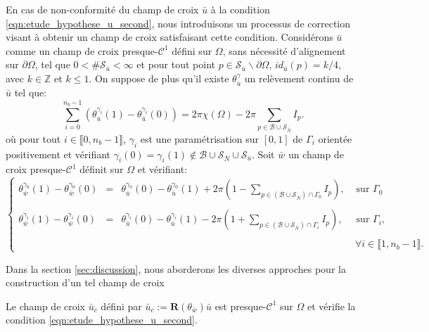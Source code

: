 En cas de non-conformité du champ de croix $\bar{u}$ à la condition \eqref{eqn:etude_hypothese_u_second}, nous introduisons un processus de correction visant à obtenir un champ de croix satisfaisant cette condition. Considérons $\bar{u}$ comme un champ de croix presque-$\mathcal{C}^1$ défini sur $\Omega$, sans nécessité d'alignement sur $\partial\Omega$, tel que $0<\#\mathcal{S}_{\bar{u}}<\infty$ et pour tout point $p\in\mathcal{S}_{\bar{u}}\backslash\partial\Omega$, $id_{\bar{u}}(p)=k/4$, avec $k\in\mathbb{Z}$ et $k\leq 1$. On suppose de plus qu'il existe $\theta_{\bar{u}}^\gamma$ un relèvement continu de $\bar{u}$ tel que:
\begin{equation}
    \displaystyle\sum_{i=0}^{n_b-1}\left(\theta_{\bar{u}}^{\gamma_i}(1)-\theta_{\bar{u}}^{\gamma_i}(0)\right)=2\pi\chi(\Omega)-2\pi\sum_{p\in\mathcal{B}\cup\mathcal{S}_{\bar{N}}}I_p.
\end{equation}
où pour tout $i\in\llbracket0, n_b-1\rrbracket$, $\gamma_i$ est une paramétrisation sur $[0, 1]$ de $\Gamma_i$ orientée positivement et vérifiant $\gamma_i(0)=\gamma_i(1)\notin\mathcal{B}\cup\mathcal{S}_{\bar{N}}\cup\mathcal{S}_{\bar{u}}$.
Soit $\bar{w}$ un champ de croix presque-$\mathcal{C}^1$ définit sur $\Omega$ et vérifiant:
\begin{equation}
    \left\{
    \begin{array}{lcll}
    \theta_{\bar{w}}^{\gamma_0}(1)-\theta_{\bar{w}}^{\gamma_0}(0)&=&\theta_{\bar{u}}^{\gamma_0}(0)-\theta_{\bar{u}}^{\gamma_0}(1)+2\pi\left(1-\displaystyle\sum_{p\in(\mathcal{B}\cup\mathcal{S}_{\bar{N}})\cap\Gamma_0}I_p\right),&\mbox{ sur }\Gamma_0\\\\
    \theta_{\bar{w}}^{\gamma_i}(1)-\theta_{\bar{w}}^{\gamma_i}(0)&=&\theta_{\bar{u}}^{\gamma_i}(0)-\theta_{\bar{u}}^{\gamma_i}(1)-2\pi\left(1+\displaystyle\sum_{p\in(\mathcal{B}\cup\mathcal{S}_{\bar{N}})\cap\Gamma_i}I_p\right),&\mbox{ sur }\Gamma_i,\\\\
    &&&~\forall i\in\llbracket 1, n_b-1\rrbracket.
    \end{array}
    \right.
    \label{eqn:etude_hypothese_w}
\end{equation}

Dans la section \ref{sec:discussion}, nous aborderons les diverses approches pour la construction d'un tel champ de croix

\begin{proposition}
    Le champ de croix $\bar{u}_c$ défini par $\bar{u}_c:=\mathbf{R}(\theta_{\bar{w}})\bar{u}$ est presque-$\mathcal{C}^1$ sur $\Omega$ et vérifie la condition \eqref{eqn:etude_hypothese_u_second}.
\end{proposition}

